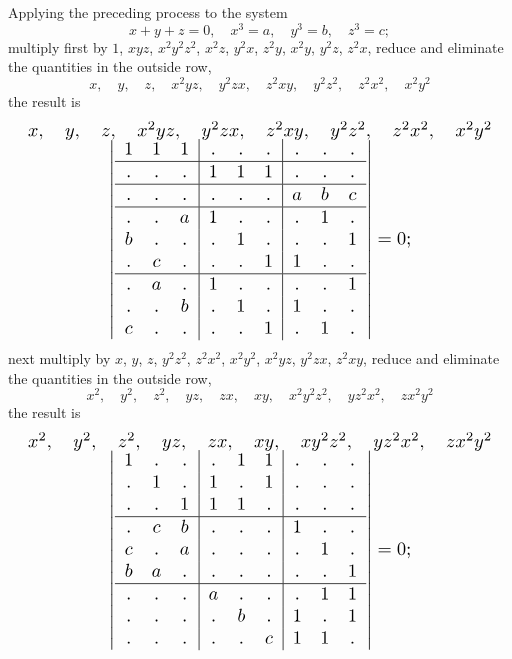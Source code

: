 \documentclass[11pt]{article}
\begin{document}
Applying the preceding process to the system
\[
x + y + z = 0, \quad x^3 = a, \quad y^3 = b, \quad z^3 = c;
\]
multiply first by $1$, $xyz$, $x^2y^2z^2$, $x^2z$, $y^2x$, $z^2y$, $x^2y$, $y^2z$, $z^2x$, reduce and eliminate the quantities in the outside row,
\[
x, \quad y, \quad z, \quad x^2yz, \quad y^2zx, \quad z^2xy, \quad y^2z^2, \quad z^2x^2, \quad x^2y^2
\]
the result is
\[
\resizebox{\textwidth}{!}{%
$\begin{array}{c}
x,\quad y,\quad z,\quad x^2yz,\quad y^2zx,\quad z^2xy,\quad y^2z^2,\quad z^2x^2,\quad x^2y^2 \\[-0.2em]
\left|
\begin{array}{ccc|ccc|ccc}
1 & 1 & 1 & . & . & . & . & . & . \\
\hline
. & . & . & 1 & 1 & 1 & . & . & . \\
\hline
. & . & . & . & . & . & a & b & c \\
\hline
. & . & a & 1 & . & . & . & 1 & . \\
b & . & . & . & 1 & . & . & . & 1 \\
. & c & . & . & . & 1 & 1 & . & . \\
\hline
. & a & . & 1 & . & . & . & . & 1 \\
. & . & b & . & 1 & . & 1 & . & . \\
c & . & . & . & . & 1 & . & 1 & .
\end{array}\right| = 0;
\end{array}$%
}
\]
next multiply by $x$, $y$, $z$, $y^2z^2$, $z^2x^2$, $x^2y^2$, $x^2yz$, $y^2zx$, $z^2xy$, reduce and eliminate the quantities in the outside row,
\[
x^2, \quad y^2, \quad z^2, \quad yz, \quad zx, \quad xy, \quad x^2y^2z^2, \quad yz^2x^2, \quad zx^2y^2
\]
the result is
\[
\resizebox{\textwidth}{!}{%
$\begin{array}{c}
x^2,\quad y^2,\quad z^2,\quad yz,\quad zx,\quad xy,\quad xy^2z^2,\quad yz^2x^2,\quad zx^2y^2 \\[-0.2em]
\left|
\begin{array}{ccc|ccc|ccc}
1 & . & . & . & 1 & 1 & . & . & . \\
. & 1 & . & 1 & . & 1 & . & . & . \\
. & . & 1 & 1 & 1 & . & . & . & . \\
\hline
. & c & b & . & . & . & 1 & . & . \\
c & . & a & . & . & . & . & 1 & . \\
b & a & . & . & . & . & . & . & 1 \\
\hline
. & . & . & a & . & . & . & 1 & 1 \\
. & . & . & . & b & . & 1 & . & 1 \\
. & . & . & . & . & c & 1 & 1 & .
\end{array}\right| = 0;
\end{array}$%
}
\]
\end{document}
